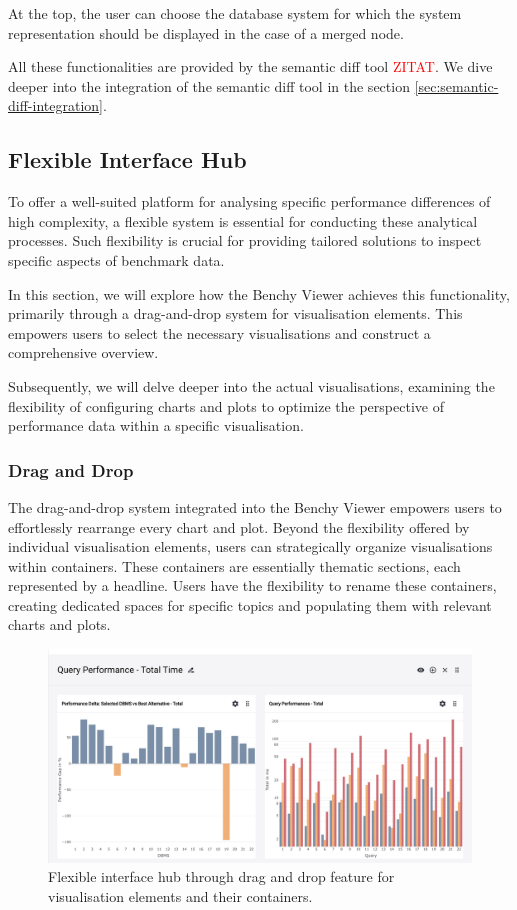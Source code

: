 At the top, the user can choose the database system for which the system representation should be displayed in the case of a merged node.

All these functionalities are provided by the semantic diff tool \textcolor{red}{ZITAT}. We dive deeper into the integration of the semantic diff tool in the section \ref{sec:semantic-diff-integration}.


\subsection{Flexible Interface Hub}

To offer a well-suited platform for analysing specific performance differences of high complexity, a flexible system is essential for conducting these analytical processes. Such flexibility is crucial for providing tailored solutions to inspect specific aspects of benchmark data.

In this section, we will explore how the Benchy Viewer achieves this functionality, primarily through a drag-and-drop system for visualisation elements. This empowers users to select the necessary visualisations and construct a comprehensive overview.

Subsequently, we will delve deeper into the actual visualisations, examining the flexibility of configuring charts and plots to optimize the perspective of performance data within a specific visualisation.

\subsubsection{Drag and Drop}
The drag-and-drop system integrated into the Benchy Viewer empowers users to effortlessly rearrange every chart and plot. Beyond the flexibility offered by individual visualisation elements, users can strategically organize visualisations within containers. These containers are essentially thematic sections, each represented by a headline. Users have the flexibility to rename these containers, creating dedicated spaces for specific topics and populating them with relevant charts and plots.

\begin{figure}[h]
  \centering
  \includegraphics[width=0.8\linewidth]{figures/analytics-drag-and-drop.png}
  \caption{Flexible interface hub through drag and drop feature for visualisation elements and their containers.}
  \label{fig:analytics-drag-and-drop}
\end{figure}

